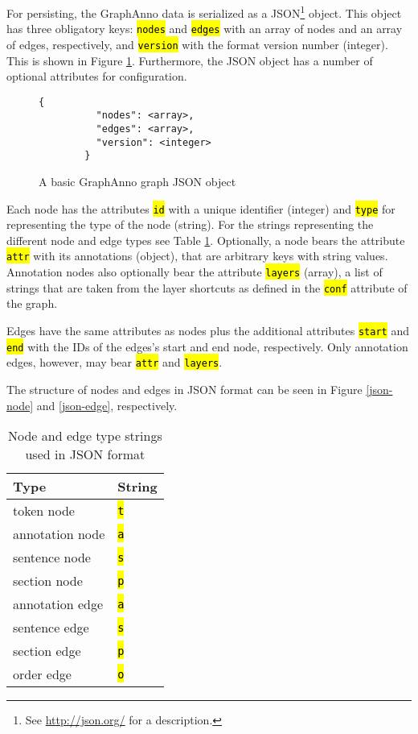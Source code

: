 \documentclass[12pt]{scrartcl}
\newcommand{\code}[1]{\hl{\texttt{#1}}}
\newenvironment{figurel}{\begin{figure}[htb]}{\end{figure}}
\newenvironment{tablel}{\begin{table}[htb]}{\end{table}}
\begin{document}
For persisting, the GraphAnno data is serialized as a JSON\footnote{See \url{http://json.org/} for a description.} object.
This object has three obligatory keys: \code{nodes} and \code{edges} with an array of nodes and an array of edges, respectively, and \code{version} with the format version number (integer).
This is shown in Figure \ref{json-basic}.
Furthermore, the JSON object has a number of optional attributes for configuration.

\begin{figurel}
	\begin{lstlisting}[gobble=8]
		{
		  "nodes": <array>,
		  "edges": <array>,
		  "version": <integer>
		}
	\end{lstlisting}
	\caption{A basic GraphAnno graph JSON object}
	\label{json-basic}
\end{figurel}

Each node has the attributes \code{id} with a unique identifier (integer) and \code{type} for representing the type of the node (string).
For the strings representing the different node and edge types see Table \ref{types-strings}.
Optionally, a node bears the attribute \code{attr} with its annotations (object), that are arbitrary keys with string values.
Annotation nodes also optionally bear the attribute \code{layers} (array), a list of strings that are taken from the layer shortcuts as defined in the \code{conf} attribute of the graph.

Edges have the same attributes as nodes plus the additional attributes \code{start} and \code{end} with the IDs of the edges’s start and end node, respectively.
Only annotation edges, however, may bear \code{attr} and \code{layers}.

The structure of nodes and edges in JSON format can be seen in Figure \ref{json-node} and \ref{json-edge}, respectively.

\begin{tablel}
	\begin{center}
		\begin{tabular*}{12em}{@{\extracolsep{\fill}} ll}
			\toprule
			Type & String\\
			\midrule
			token node & \code{t}\\
			annotation node & \code{a}\\
			sentence node & \code{s}\\
			section node & \code{p}\\
			\midrule
			annotation edge & \code{a}\\
			sentence edge & \code{s}\\
			section edge & \code{p}\\
			order edge & \code{o}\\
			\bottomrule
		\end{tabular*}
	\end{center}
	\caption{Node and edge type strings used in JSON format}
	\label{types-strings}
\end{tablel}
\end{document}
